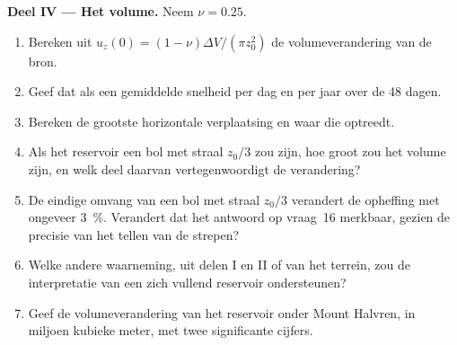 \begin{problem}
\medskip\noindent\textbf{Deel IV --- Het volume.} Neem $\nu = 0.25$.
\begin{enumerate}[resume]
\item Bereken uit $u_z(0) = (1 - \nu)\Delta V/(\pi z_0^2)$ de volumeverandering van de
  bron.
\item Geef dat als een gemiddelde snelheid per dag en per jaar over de 48 dagen.
\item Bereken de grootste horizontale verplaatsing en waar die optreedt.
\item Als het reservoir een bol met straal $z_0/3$ zou zijn, hoe groot zou het
  volume zijn, en welk deel daarvan vertegenwoordigt de verandering?
\item De eindige omvang van een bol met straal $z_0/3$ verandert de opheffing met
  ongeveer \qty{3}{\percent}. Verandert dat het antwoord op vraag~16
  merkbaar, gezien de precisie van het tellen van de strepen?
\item Welke andere waarneming, uit delen I en II of van het terrein,
  zou de interpretatie van een zich vullend reservoir ondersteunen?
\item Geef de volumeverandering van het reservoir onder Mount Halvren,
  in miljoen kubieke meter, met twee significante cijfers.
\end{enumerate}
\end{problem}
